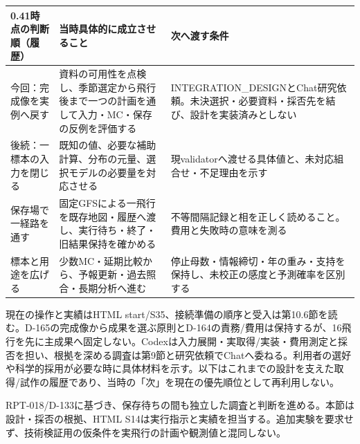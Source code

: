\documentclass[11pt,a4paper]{article}
\newcounter{none}
\begin{document}
{\def\LTcaptype{none} %
\begin{longtable}[]{@{}
  >{\raggedright\arraybackslash}p{}
  >{\raggedright\arraybackslash}p{}
  >{\raggedright\arraybackslash}p{}@{}}
\toprule\noalign{}
\begin{minipage}[b]{\linewidth}\raggedright
0.41時点の判断順（履歴）
\end{minipage} & \begin{minipage}[b]{\linewidth}\raggedright
当時具体的に成立させること
\end{minipage} & \begin{minipage}[b]{\linewidth}\raggedright
次へ渡す条件
\end{minipage} \\
\midrule\noalign{}
\endhead
\bottomrule\noalign{}
\endlastfoot
今回：完成像を実例へ戻す &
資料の可用性を点検し、季節選定から飛行後まで一つの計画を通して入力・MC・保存の反例を評価する
&
INTEGRATION\_DESIGNとChat研究依頼。未決選択・必要資料・採否先を結び、設計を実装済みとしない \\
後続：一標本の入力を閉じる &
既知の値、必要な補助計算、分布の元量、選択モデルの必要量を対応させる &
現validatorへ渡せる具体値と、未対応組合せ・不足理由を示す \\
保存場で一経路を通す &
固定GFSによる一飛行を既存地図・履歴へ渡し、実行待ち・終了・旧結果保持を確かめる
& 不等間隔記録と相を正しく読めること。費用と失敗時の意味を測る \\
標本と用途を広げる &
少数MC・延期比較から、予報更新・過去照合・長期分析へ進む &
停止母数・情報締切・年の重み・支持を保持し、未校正の感度と予測確率を区別する \\
\end{longtable}
}

現在の操作と実績はHTML
start/S35、接続準備の順序と受入は第10.6節を読む。D-165の完成像から成果を選ぶ原則とD-164の責務/費用は保持するが、16飛行を先に主成果へ固定しない。Codexは入力展開・実取得/実装・費用測定と採否を担い、根拠を深める調査は第9節と研究依頼でChatへ委ねる。利用者の選好や科学的採用が必要な時に具体材料を示す。以下はこれまでの設計を支えた取得/試作の履歴であり、当時の「次」を現在の優先順位として再利用しない。

RPT-018/D-133に基づき、保存待ちの間も独立した調査と判断を進める。本節は設計・採否の根拠、HTML
S14は実行指示と実績を担当する。追加実験を要求せず、技術検証用の仮条件を実飛行の計画や観測値と混同しない。
\end{document}
